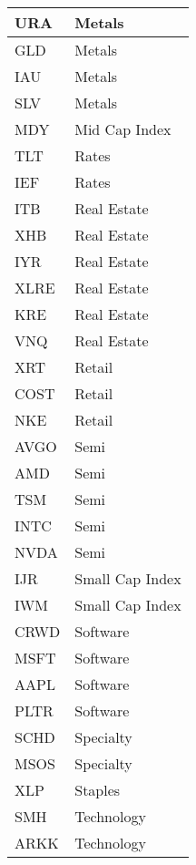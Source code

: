 \begin{table}[H]
\begin{tabular}{ll}
        URA & Metals \\
        \hline
        GLD & Metals \\
        \hline
        IAU & Metals \\
        \hline
        SLV & Metals \\
        \hline
        MDY & Mid Cap Index \\
        \hline
        TLT & Rates \\
        \hline
        IEF & Rates \\
        \hline
        ITB & Real Estate \\
        \hline
        XHB & Real Estate \\
        \hline
        IYR & Real Estate \\
        \hline
        XLRE & Real Estate \\
        \hline
        KRE & Real Estate \\
        \hline
        VNQ & Real Estate \\
        \hline
        XRT & Retail \\
        \hline
        COST & Retail \\
        \hline
        NKE & Retail \\
        \hline
        AVGO & Semi \\
        \hline
        AMD & Semi \\
        \hline
        TSM & Semi \\
        \hline
        INTC & Semi \\
        \hline
        NVDA & Semi \\
        \hline
        IJR & Small Cap Index \\
        \hline
        IWM & Small Cap Index \\
        \hline
        CRWD & Software \\
        \hline
        MSFT & Software \\
        \hline
        AAPL & Software \\
        \hline
        PLTR & Software \\
        \hline
        SCHD & Specialty \\
        \hline
        MSOS & Specialty \\
        \hline
        XLP & Staples \\
        \hline
        SMH & Technology \\
        \hline
        ARKK & Technology \\
        \hline

\end{tabular}
\end{table}
